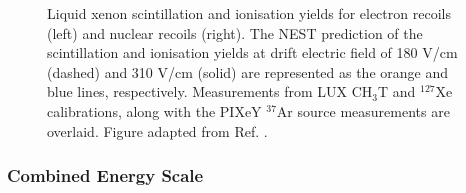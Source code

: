 \begin{figure}[hbt!]
\begin{subfigure}
    \end{subfigure}
    \vspace*{-5mm}
    \caption[Liquid xenon scintillation and ionisation yields for electron recoils and nuclear recoils.]%
    {Liquid xenon scintillation and ionisation yields for electron recoils (left) and nuclear recoils (right). The NEST prediction of the scintillation and ionisation yields at drift electric field of 180 V/cm (dashed) and 310 V/cm (solid) are represented as the orange and blue lines, respectively. Measurements from LUX CH$_{3}$T \cite{lux_tritium} and $^{127}$Xe \cite{lux_low_energy_cal} calibrations, along with the PIXeY $^{37}$Ar source measurements \cite{PIXeY} are overlaid. Figure adapted from Ref. \cite{ibles}.}
    \label{fig:light_charge_yields}
\end{figure}
%

\subsubsection{Combined Energy Scale}
\label{subsubsec:combined_energy}

